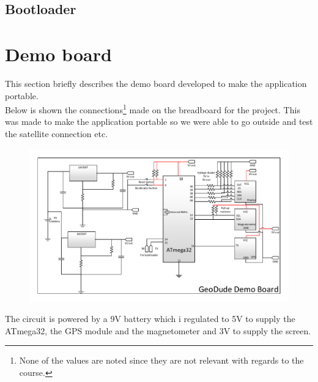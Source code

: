 \subsection{Bootloader}

\section{Demo board}
This section briefly describes the demo board developed to make the application portable.\\
Below is shown the connections\footnote{None of the values are noted since they are not relevant with regards to the course.} made on the breadboard for the project. This was made to make the application portable so we were able to go outside and test the satellite connection etc.\\

\begin{figure}[H]
\centering
\includegraphics[width=1\textwidth]{billeder/GeodudeDemoBoard}
\end{figure}

The circuit is powered by a 9V battery which i regulated to 5V to supply the ATmega32, the GPS module and the magnetometer and 3V to supply the screen.